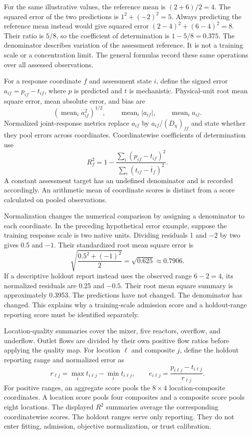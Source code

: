 For the same illustrative values, the reference mean is $(2+6)/2=4$. The squared error of the two predictions is $1^2+(-2)^2=5$. Always predicting the reference mean instead would give squared error $(2-4)^2+(6-4)^2=8$. Their ratio is $5/8$, so the coefficient of determination is $1-5/8=0.375$. The denominator describes variation of the assessment reference. It is not a training scale or a concentration limit. The general formulas record these same operations over all assessed observations.

For a response coordinate $f$ and assessment state $i$, define the signed error $a_{if}=p_{if}-t_{if}$, where $p$ is predicted and $t$ is mechanistic. Physical-unit root mean square error, mean absolute error, and bias are
\begin{equation}
\left(\operatorname{mean}_i a_{if}^2\right)^{1/2},\qquad
\operatorname{mean}_i|a_{if}|,\qquad
\operatorname{mean}_i a_{if}.
\end{equation}
Normalized joint-response metrics replace $a_{if}$ by $a_{if}/(D_\chi)_{ff}$ and state whether they pool errors across coordinates. Coordinatewise coefficients of determination use
\begin{equation}
R_f^2=1-\frac{\sum_i(p_{if}-t_{if})^2}{\sum_i(t_{if}-\bar t_f)^2}.
\end{equation}
A constant assessment target has an undefined denominator and is recorded accordingly. An arithmetic mean of coordinate scores is distinct from a score calculated on pooled observations.

Normalization changes the numerical comparison by assigning a denominator to each coordinate. In the preceding hypothetical error example, suppose the training response scale is two native units. Dividing residuals 1 and $-2$ by two gives 0.5 and $-1$. Their standardized root mean square error is
\[
\sqrt{\frac{0.5^2+(-1)^2}{2}}=\sqrt{0.625}\approx0.7906.
\]
If a descriptive holdout report instead uses the observed range $6-2=4$, its normalized residuals are 0.25 and $-0.5$. Their root mean square summary is approximately 0.3953. The predictions have not changed. The denominator has changed. This explains why a training-scale admission score and a holdout-range reporting score must be identified separately.

Location-quality summaries cover the mixer, five reactors, overflow, and underflow. Outlet flows are divided by their own positive flow ratios before applying the quality map. For location $\ell$ and composite $j$, define the holdout reporting range and normalized error as
\begin{equation}
r_{\ell j}=\max_it_{i\ell j}-\min_it_{i\ell j},\qquad
e_{i\ell j}=\frac{p_{i\ell j}-t_{i\ell j}}{r_{\ell j}}.
\end{equation}
For positive ranges, an aggregate score pools the $8\times4$ location-composite coordinates. A location score pools four composites and a composite score pools eight locations. The displayed $R^2$ summaries average the corresponding coordinatewise scores. The holdout ranges serve only reporting. They do not enter fitting, admission, objective normalization, or trust calibration.

